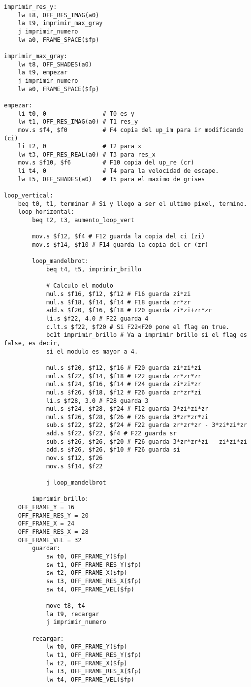 \documentclass[a4paper,10pt]{article}
\begin{document}
\begin{verbatim}
imprimir_res_y:
	lw t8, OFF_RES_IMAG(a0)
	la t9, imprimir_max_gray
	j imprimir_numero
	lw a0, FRAME_SPACE($fp)
	
imprimir_max_gray:
	lw t8, OFF_SHADES(a0)
	la t9, empezar
	j imprimir_numero
	lw a0, FRAME_SPACE($fp)

empezar:
	li t0, 0 				# T0 es y
	lw t1, OFF_RES_IMAG(a0) # T1 res_y
	mov.s $f4, $f0 			# F4 copia del up_im para ir modificando (ci)
	li t2, 0 				# T2 para x
	lw t3, OFF_RES_REAL(a0) # T3 para res_x
	mov.s $f10, $f6 		# F10 copia del up_re (cr)
	li t4, 0 				# T4 para la velocidad de escape.
	lw t5, OFF_SHADES(a0)	# T5 para el maximo de grises

loop_vertical:
	beq t0, t1, terminar # Si y llego a ser el ultimo pixel, termino.
	loop_horizontal:
		beq t2, t3, aumento_loop_vert

		mov.s $f12, $f4 # F12 guarda la copia del ci (zi)
		mov.s $f14, $f10 # F14 guarda la copia del cr (zr)

		loop_mandelbrot:
			beq t4, t5, imprimir_brillo

			# Calculo el modulo
			mul.s $f16, $f12, $f12 # F16 guarda zi*zi
			mul.s $f18, $f14, $f14 # F18 guarda zr*zr
			add.s $f20, $f16, $f18 # F20 guarda zi*zi+zr*zr
			li.s $f22, 4.0 # F22 guarda 4
			c.lt.s $f22, $f20 # Si F22<F20 pone el flag en true.
			bc1t imprimir_brillo # Va a imprimir brillo si el flag es false, es decir,
			si el modulo es mayor a 4.

			mul.s $f20, $f12, $f16 # F20 guarda zi*zi*zi
			mul.s $f22, $f14, $f18 # F22 guarda zr*zr*zr
			mul.s $f24, $f16, $f14 # F24 guarda zi*zi*zr
			mul.s $f26, $f18, $f12 # F26 guarda zr*zr*zi
			li.s $f28, 3.0 # F28 guarda 3
			mul.s $f24, $f28, $f24 # F12 guarda 3*zi*zi*zr
			mul.s $f26, $f28, $f26 # F26 guarda 3*zr*zr*zi
			sub.s $f22, $f22, $f24 # F22 guarda zr*zr*zr - 3*zi*zi*zr
			add.s $f22, $f22, $f4 # F22 guarda sr
			sub.s $f26, $f26, $f20 # F26 guarda 3*zr*zr*zi - zi*zi*zi
			add.s $f26, $f26, $f10 # F26 guarda si
			mov.s $f12, $f26
			mov.s $f14, $f22

			j loop_mandelbrot

		imprimir_brillo:
	OFF_FRAME_Y = 16
	OFF_FRAME_RES_Y = 20
	OFF_FRAME_X = 24
	OFF_FRAME_RES_X = 28
	OFF_FRAME_VEL = 32
		guardar:	
			sw t0, OFF_FRAME_Y($fp)
			sw t1, OFF_FRAME_RES_Y($fp)
			sw t2, OFF_FRAME_X($fp)
			sw t3, OFF_FRAME_RES_X($fp)
			sw t4, OFF_FRAME_VEL($fp)
			
			move t8, t4
			la t9, recargar
			j imprimir_numero
		
		recargar:
			lw t0, OFF_FRAME_Y($fp)
			lw t1, OFF_FRAME_RES_Y($fp)
			lw t2, OFF_FRAME_X($fp)
			lw t3, OFF_FRAME_RES_X($fp)
			lw t4, OFF_FRAME_VEL($fp)


\end{verbatim}
\end{document}
